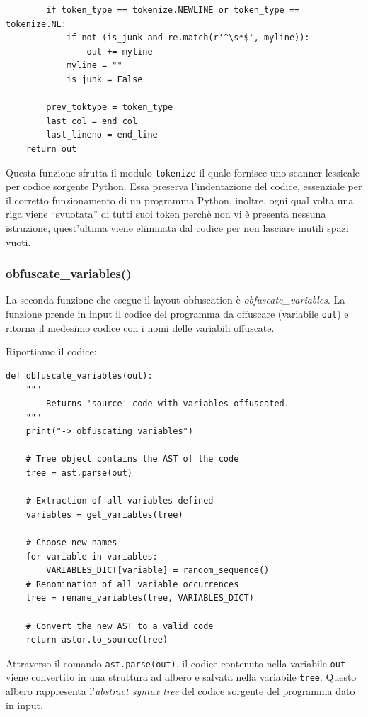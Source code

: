 \documentclass[a4paper,oneside,openright,titlepage,10pt,footinclude,headinclude]{scrbook}
\begin{document}
\begin{graybox}[innerleftmargin=2,]
\begin{lstlisting}
        if token_type == tokenize.NEWLINE or token_type == tokenize.NL:
            if not (is_junk and re.match(r'^\s*$', myline)):
                out += myline
            myline = ""
            is_junk = False

        prev_toktype = token_type
        last_col = end_col
        last_lineno = end_line
    return out
\end{lstlisting}
\end{graybox}
Questa funzione sfrutta il modulo \texttt{tokenize} il quale  fornisce uno scanner lessicale per codice sorgente Python.
Essa preserva l'indentazione del codice, essenziale per il corretto funzionamento di un programma Python, inoltre, ogni qual volta una  riga viene ``svuotata'' di tutti suoi token perchè non vi è presenta nessuna istruzione, quest'ultima viene eliminata dal codice per non lasciare inutili spazi vuoti.

\subsubsection{obfuscate\_variables()}\label{obfuscate_variables}

La seconda funzione che esegue il layout obfuscation è \emph{obfuscate\_variables}.
La funzione prende in input il codice del programma da offuscare (variabile \texttt{out}) e ritorna il medesimo codice con i nomi delle variabili offuscate.\medskip


\noindent Riportiamo il codice:
\begin{graybox}[innerleftmargin=2,]
\begin{lstlisting}
def obfuscate_variables(out):
    """
        Returns 'source' code with variables offuscated.
    """
    print("-> obfuscating variables")

    # Tree object contains the AST of the code
    tree = ast.parse(out)

    # Extraction of all variables defined
    variables = get_variables(tree)

    # Choose new names
    for variable in variables:
        VARIABLES_DICT[variable] = random_sequence()
    # Renomination of all variable occurrences
    tree = rename_variables(tree, VARIABLES_DICT)

    # Convert the new AST to a valid code
    return astor.to_source(tree)
\end{lstlisting}
\end{graybox}

Attraverso il comando \texttt{ast.parse(out)}, il codice contenuto nella variabile \texttt{out} viene convertito in una struttura ad albero e salvata nella variabile \texttt{tree}. Questo albero rappresenta l'\emph{abstract syntax tree} del codice sorgente del programma dato in input.
\end{document}

